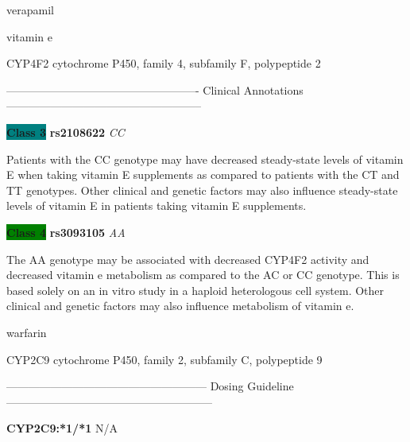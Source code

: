 \documentclass{resume} %
\begin{document}
\begin{rSection}{ verapamil }
\end{rSection}\begin{rSection}{ vitamin e }
\item[]

\begin{rSubsection}{ CYP4F2 }{ cytochrome P450, family 4, subfamily F, polypeptide 2 }{}{}
\item[]

\item[] ---------------------------------------------------- Clinical Annotations -----------------------------------------------------\newline
\item \textbf{\colorbox{teal} {Class 3}} \textbf{ rs2108622 } \textit{ CC }
\item[] Patients with the CC genotype may have decreased steady-state levels of vitamin E when taking vitamin E supplements as compared to patients with the CT and TT genotypes. Other clinical and genetic factors may also influence steady-state levels of vitamin E in patients taking vitamin E supplements.\item \textbf{\colorbox{green} {Class 4}} \textbf{ rs3093105 } \textit{ AA }
\item[] The AA genotype may be associated with decreased CYP4F2 activity and decreased vitamin e metabolism as compared to the AC or CC genotype. This is based solely on an in vitro study in a haploid heterologous cell system. Other clinical and genetic factors may also influence metabolism of vitamin e.
\end{rSubsection}

\end{rSection}\begin{rSection}{ warfarin }
\item[]

\begin{rSubsection}{ CYP2C9 }{ cytochrome P450, family 2, subfamily C, polypeptide 9 }{}{}
\item[]
\item[] ------------------------------------------------------ Dosing Guideline --------------------------------------------------------\newline
\item[] \textbf{ CYP2C9:*1/*1 } N/A


\end{rSubsection}
\end{rSection}
\end{document}
